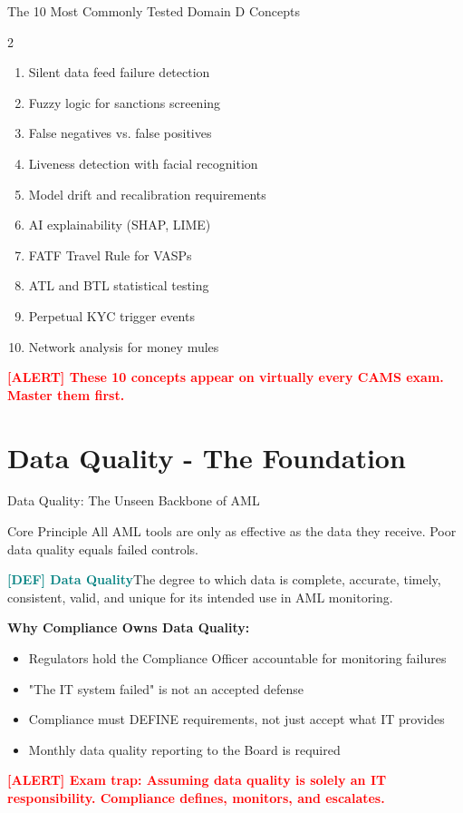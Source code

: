 \documentclass[11pt,a4paper]{beamer}
\newcommand{\redflag}[1]{\textcolor{red}{\textbf{[ALERT] #1}}}
\renewcommand{\definition}[1]{\textcolor{teal}{\textbf{[DEF] #1}}}
\begin{document}
	\begin{frame}{The 10 Most Commonly Tested Domain D Concepts}
		\begin{multicols}{2}
			\begin{enumerate}
				\item Silent data feed failure detection
				\item Fuzzy logic for sanctions screening
				\item False negatives vs. false positives
				\item Liveness detection with facial recognition
				\item Model drift and recalibration requirements
				\item AI explainability (SHAP, LIME)
				\item FATF Travel Rule for VASPs
				\item ATL and BTL statistical testing
				\item Perpetual KYC trigger events
				\item Network analysis for money mules
			\end{enumerate}
		\end{multicols}
		
		\redflag{These 10 concepts appear on virtually every CAMS exam. Master them first.}
	\end{frame}
	
	\section{Data Quality - The Foundation}
	
	\begin{frame}{Data Quality: The Unseen Backbone of AML}
		\begin{block}{Core Principle}
			All AML tools are only as effective as the data they receive. Poor data quality equals failed controls.
		\end{block}
		
		\definition{Data Quality}{The degree to which data is complete, accurate, timely, consistent, valid, and unique for its intended use in AML monitoring.}
		
		\textbf{Why Compliance Owns Data Quality:}
		\begin{itemize}
			\item Regulators hold the Compliance Officer accountable for monitoring failures
			\item "The IT system failed" is not an accepted defense
			\item Compliance must DEFINE requirements, not just accept what IT provides
			\item Monthly data quality reporting to the Board is required
		\end{itemize}
		
		\redflag{Exam trap: Assuming data quality is solely an IT responsibility. Compliance defines, monitors, and escalates.}
	\end{frame}
	
\end{document}

